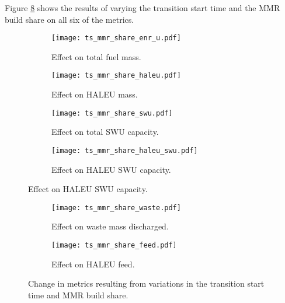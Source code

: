 Figure \ref{fig:ts_mmr_share} shows the results of varying the 
transition start time and the \gls{MMR} build share on all 
six of the metrics. 

\begin{figure}
    \begin{subfigure}[t]{0.48\textwidth}
        \centering
        \texttt{[image: ts\_mmr\_share\_enr\_u.pdf]}
        \caption{Effect on total fuel mass.}
        \label{fig:ts_mmr_share_enr_u}
    \end{subfigure}
    \hfill
    \begin{subfigure}[t]{0.48\textwidth}
        \centering
        \texttt{[image: ts\_mmr\_share\_haleu.pdf]}
        \caption{Effect on HALEU mass.}
        \label{fig:ts_mmr_share_haleu}
    \end{subfigure}
    
    \begin{subfigure}[t]{0.48\textwidth}
        \centering
        \texttt{[image: ts\_mmr\_share\_swu.pdf]}
        \caption{Effect on total SWU capacity.}
        \label{fig:ts_mmr_share_swu}
    \end{subfigure}
    \hfill
    \begin{subfigure}[t]{0.48\textwidth}
        \centering
        \texttt{[image: ts\_mmr\_share\_haleu\_swu.pdf]}
        \caption{Effect on HALEU SWU capacity.}
        \label{fig:ts_mmr_share_haleu_swu}
    \end{subfigure}
\end{figure}

\begin{figure}
    \ContinuedFloat
    \begin{subfigure}[t]{0.48\textwidth}
        \centering
        \texttt{[image: ts\_mmr\_share\_waste.pdf]}
        \caption{Effect on waste mass discharged.}
        \label{fig:ts_mmr_share_waste}
    \end{subfigure}
    \hfill
    \begin{subfigure}[t]{0.48\textwidth}
        \centering
        \texttt{[image: ts\_mmr\_share\_feed.pdf]}
        \caption{Effect on HALEU feed.}
        \label{fig:ts_mmr_share_feed}
    \end{subfigure}
    \caption{Change in metrics resulting from variations in the 
    transition start time and MMR build share.}
    \label{fig:ts_mmr_share}
\end{figure}

